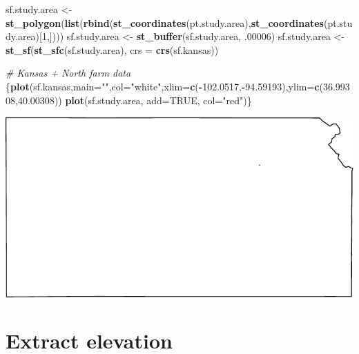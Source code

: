 \documentclass[
]{book}
\newenvironment{Shaded}{\begin{snugshade}}{\end{snugshade}}
\newcommand{\AttributeTok}[1]{\textcolor[rgb]{0.13,0.29,0.53}{#1}}
\newcommand{\CommentTok}[1]{\textcolor[rgb]{0.56,0.35,0.01}{\textit{#1}}}
\newcommand{\ConstantTok}[1]{\textcolor[rgb]{0.56,0.35,0.01}{#1}}
\newcommand{\DecValTok}[1]{\textcolor[rgb]{0.00,0.00,0.81}{#1}}
\newcommand{\FloatTok}[1]{\textcolor[rgb]{0.00,0.00,0.81}{#1}}
\newcommand{\FunctionTok}[1]{\textcolor[rgb]{0.13,0.29,0.53}{\textbf{#1}}}
\newcommand{\NormalTok}[1]{#1}
\newcommand{\OtherTok}[1]{\textcolor[rgb]{0.56,0.35,0.01}{#1}}
\newcommand{\SpecialCharTok}[1]{\textcolor[rgb]{0.81,0.36,0.00}{\textbf{#1}}}
\newcommand{\StringTok}[1]{\textcolor[rgb]{0.31,0.60,0.02}{#1}}
\begin{document}
\begin{Shaded}
\begin{Highlighting}[]
\NormalTok{sf.study.area  }\OtherTok{\textless{}{-}} \FunctionTok{st\_polygon}\NormalTok{(}\FunctionTok{list}\NormalTok{(}\FunctionTok{rbind}\NormalTok{(}\FunctionTok{st\_coordinates}\NormalTok{(pt.study.area),}\FunctionTok{st\_coordinates}\NormalTok{(pt.study.area)[}\DecValTok{1}\NormalTok{,])))}
\NormalTok{sf.study.area }\OtherTok{\textless{}{-}} \FunctionTok{st\_buffer}\NormalTok{(sf.study.area, .}\DecValTok{00006}\NormalTok{)}
\NormalTok{sf.study.area }\OtherTok{\textless{}{-}} \FunctionTok{st\_sf}\NormalTok{(}\FunctionTok{st\_sfc}\NormalTok{(sf.study.area), }\AttributeTok{crs =} \FunctionTok{crs}\NormalTok{(sf.kansas))}

\CommentTok{\# Kansas + North farm data}
\NormalTok{\{}\FunctionTok{plot}\NormalTok{(sf.kansas,}\AttributeTok{main=}\StringTok{""}\NormalTok{,}\AttributeTok{col=}\StringTok{"white"}\NormalTok{,}\AttributeTok{xlim=}\FunctionTok{c}\NormalTok{(}\SpecialCharTok{{-}}\FloatTok{102.0517}\NormalTok{,}\SpecialCharTok{{-}}\FloatTok{94.59193}\NormalTok{),}\AttributeTok{ylim=}\FunctionTok{c}\NormalTok{(}\FloatTok{36.99308}\NormalTok{,}\FloatTok{40.00308}\NormalTok{))}
\FunctionTok{plot}\NormalTok{(sf.study.area, }\AttributeTok{add=}\ConstantTok{TRUE}\NormalTok{, }\AttributeTok{col=}\StringTok{"red"}\NormalTok{)\}}
\end{Highlighting}
\end{Shaded}

\includegraphics{_main_files/figure-latex/unnamed-chunk-13-1.pdf}

\hypertarget{extract-elevation}{%
\section{Extract elevation}\label{extract-elevation}}
\end{document}

